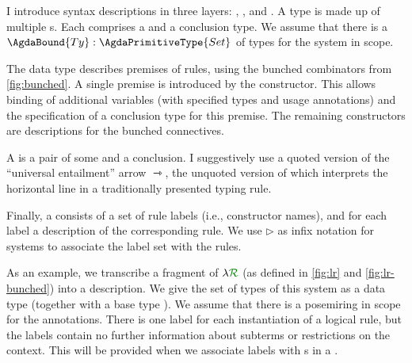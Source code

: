 I introduce syntax descriptions in three layers: ,
, and .
A type  is made up of multiple s.
Each  comprises a  and
a conclusion type. We assume that there is a
$\AgdaBound{Ty} : \AgdaPrimitiveType{Set}$ of types for the system in
scope.

The  data type describes premises of rules,
using the bunched combinators from \cref{fig:bunched}. A single
premise is introduced by the
constructor.  This allows binding of additional variables
\AgdaBound{$\Delta$} (with specified types and usage annotations) and
the specification of a conclusion type  for this premise.
The remaining constructors are descriptions for the
bunched connectives. %


A  is a pair of some  and a
conclusion.
I suggestively use a quoted version of the ``universal entailment'' arrow
$\rightarrowtriangle$, the unquoted version of which interprets the horizontal
line in a traditionally presented typing rule.


Finally, a  consists of a set of rule labels (i.e.,
constructor names), and for each label a description of the
corresponding rule. We use $\rhd$ as infix notation for systems to
associate the label set with the rules.



As an example, we transcribe a fragment of $\name$ (as defined in
\cref{fig:lr} and \cref{fig:lr-bunched}) into a description.
We give the set of types of
this system as a data type  (together with a base
type \AgdaInductiveConstructor{$\iota$}). We assume that there is a
posemiring  in scope for the
annotations.
There is one label for each instantiation of a logical
rule, but the labels contain no further information about subterms or
restrictions on the context. This will be provided when we associate
labels with s in a .


